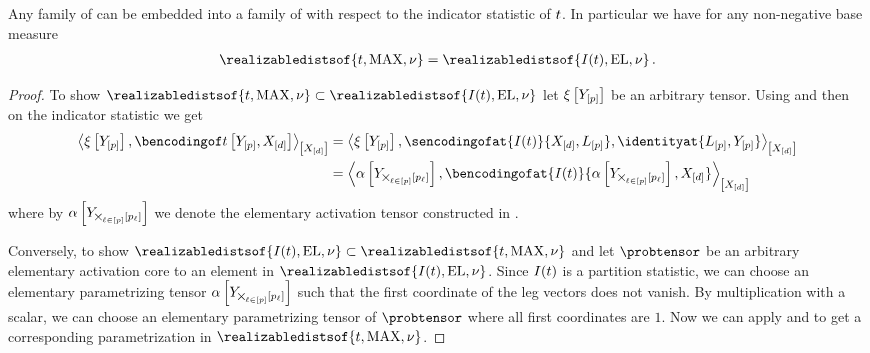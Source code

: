 \documentclass[aps,onecolumn,nofootinbib,pra]{article}
\begin{document}
    \begin{theorem}
        Any family of \ComputationActivationNetworks{} can be embedded into a family of \HybridLogicNetworks{} with respect to the indicator statistic of $t$.
        In particular we have for any non-negative base measure
        \begin{align*}
            \realizabledistsof{\sstat,\maxgraph,\basemeasure} =
            \realizabledistsof{I(\sstat),\elgraph,\basemeasure} \, .
        \end{align*}
    \end{theorem}
    \begin{proof}
        To show $\realizabledistsof{\sstat,\maxgraph,\basemeasure} \subset \realizabledistsof{I(\sstat),\elgraph,\basemeasure}$ let $\xi\left[Y_{[p]}\right]$ be an arbitrary tensor.
        Using  and then  on the indicator statistic we get
        \begin{align*}
            \contractionof{\acttensorat{\headvariables},\bencsstatwith}{\shortcatvariables}
            &= \contractionof{\acttensorat{\headvariables},\sencodingofat{I(\sstat)}{\shortcatvariables,\selvariableof{[\seldim]}},\identityat{\selvariableof{[\seldim]},\headvariables}}{\shortcatvariables}\\
            &= \contractionof{
                \actcoreat{\headvariableof{\bigtimes_{\selindexin}[\seldimof{\selindex}]}},\bencodingofat{I(\sstat)}{\actcoreat{\headvariableof{\bigtimes_{\selindexin}[\seldimof{\selindex}]}},\shortcatvariables}
            }{\shortcatvariables}
        \end{align*}
        where by $\alpha\left[Y_{\bigtimes_{\ell\in[p]}[p_{\ell}]}\right]$ we denote the elementary activation tensor constructed in .

        Conversely, to show $\realizabledistsof{I(\sstat),\elgraph,\basemeasure}\subset\realizabledistsof{\sstat,\maxgraph,\basemeasure}$ and let $\probtensor$ be an arbitrary elementary activation core to an element in $\realizabledistsof{I(\sstat),\elgraph,\basemeasure}$.
        Since $I(t)$ is a partition statistic, we can choose an elementary parametrizing tensor $\alpha\left[Y_{\bigtimes_{\ell\in[p]}[p_{\ell}]}\right]$ such that the first coordinate of the leg vectors does not vanish.
        By multiplication with a scalar, we can choose an elementary parametrizing tensor of $\probtensor$ where all first coordinates are $1$.
        Now we can apply  and  to get a corresponding parametrization in $\realizabledistsof{\sstat,\maxgraph,\basemeasure}$.
    \end{proof}
\end{document}
